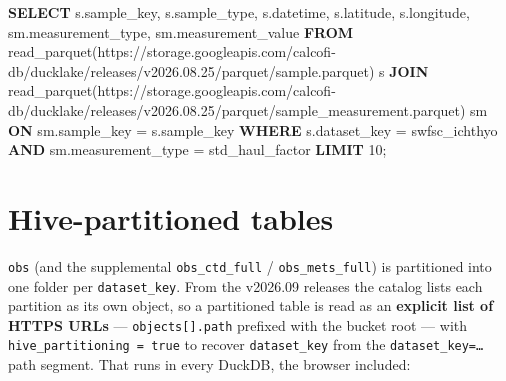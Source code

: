 \documentclass[
  letterpaper,
  DIV=11,
  numbers=noendperiod]{scrreprt}
\newenvironment{Shaded}{\begin{snugshade}}{\end{snugshade}}
\newcommand{\DecValTok}[1]{\textcolor[rgb]{0.68,0.00,0.00}{#1}}
\newcommand{\KeywordTok}[1]{\textcolor[rgb]{0.00,0.23,0.31}{\textbf{#1}}}
\newcommand{\NormalTok}[1]{\textcolor[rgb]{0.00,0.23,0.31}{#1}}
\newcommand{\OperatorTok}[1]{\textcolor[rgb]{0.37,0.37,0.37}{#1}}
\newcommand{\StringTok}[1]{\textcolor[rgb]{0.13,0.47,0.30}{#1}}
\begin{document}
\begin{Shaded}
\begin{Highlighting}[]
\KeywordTok{SELECT}\NormalTok{ s.sample\_key, s.sample\_type, s.datetime, s.latitude, s.longitude,}
\NormalTok{       sm.measurement\_type, sm.measurement\_value}
\KeywordTok{FROM}\NormalTok{ read\_parquet(}\StringTok{\textquotesingle{}https://storage.googleapis.com/calcofi{-}db/ducklake/releases/v2026.08.25/parquet/sample.parquet\textquotesingle{}}\NormalTok{) s}
\KeywordTok{JOIN}\NormalTok{ read\_parquet(}\StringTok{\textquotesingle{}https://storage.googleapis.com/calcofi{-}db/ducklake/releases/v2026.08.25/parquet/sample\_measurement.parquet\textquotesingle{}}\NormalTok{) sm }\KeywordTok{ON}\NormalTok{ sm.sample\_key }\OperatorTok{=}\NormalTok{ s.sample\_key}
\KeywordTok{WHERE}\NormalTok{ s.dataset\_key }\OperatorTok{=} \StringTok{\textquotesingle{}swfsc\_ichthyo\textquotesingle{}}
  \KeywordTok{AND}\NormalTok{ sm.measurement\_type }\OperatorTok{=} \StringTok{\textquotesingle{}std\_haul\_factor\textquotesingle{}}
\KeywordTok{LIMIT} \DecValTok{10}\NormalTok{;}
\end{Highlighting}
\end{Shaded}

\section{Hive-partitioned tables}\label{hive-partitioned-tables}

\texttt{obs} (and the supplemental \texttt{obs\_ctd\_full} /
\texttt{obs\_mets\_full}) is partitioned into one folder per
\texttt{dataset\_key}. From the v2026.09 releases the catalog lists each
partition as its own object, so a partitioned table is read as an
\textbf{explicit list of HTTPS URLs} --- \texttt{objects{[}{]}.path}
prefixed with the bucket root --- with
\texttt{hive\_partitioning\ =\ true} to recover \texttt{dataset\_key}
from the \texttt{dataset\_key=…} path segment. That runs in every
DuckDB, the browser included:
\end{document}
